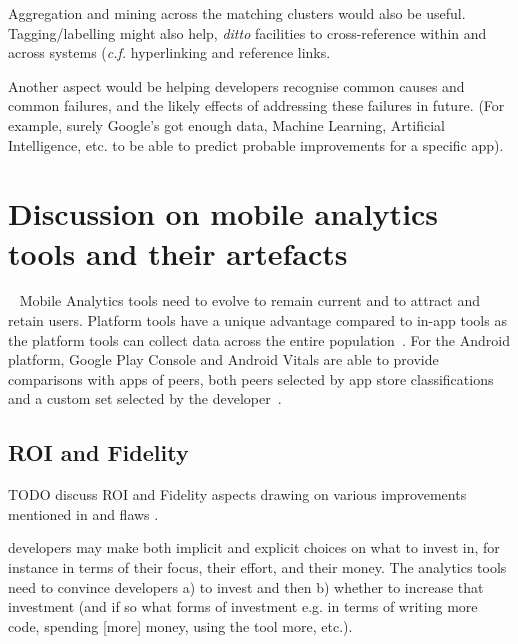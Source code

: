Aggregation and mining across the matching clusters would also be useful. Tagging/labelling might also help, \emph{ditto} facilities to cross-reference within and across systems (\emph{c.f.} hyperlinking and reference links.

Another aspect would be helping developers recognise common causes and common failures, and the likely effects of addressing these failures in future. (For example, surely Google's got enough data, Machine Learning, Artificial Intelligence, etc. to be able to predict probable improvements for a specific app).


\section[Discussion]{Discussion on mobile analytics tools and their artefacts}~\label{tata-discussion-section}
Mobile Analytics tools need to evolve to remain current and to attract and retain users. Platform tools have a unique advantage compared to in-app tools as the platform tools can collect data across the entire population~. For the Android platform, Google Play Console and Android Vitals are able to provide comparisons with apps of peers, both peers selected by app store classifications~ and a custom set selected by the developer~. 

\subsection{ROI and Fidelity}
TODO discuss ROI and Fidelity aspects drawing on various improvements mentioned in  and flaws .

 developers may make both implicit and explicit choices on what to invest in, for instance in terms of their focus, their effort, and their money. The analytics tools need to convince developers a) to invest and then b) whether to increase that investment (and if so what forms of investment e.g. in terms of writing more code, spending [more] money, using the tool more, etc.).
    
